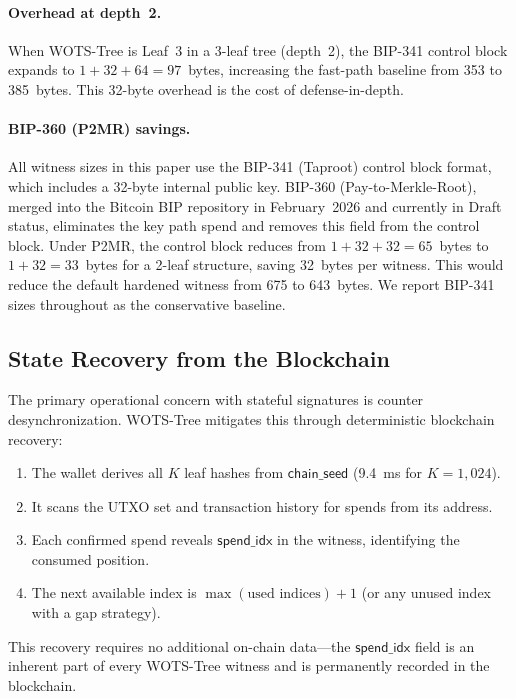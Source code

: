 \documentclass[11pt,a4paper]{article}
\theoremstyle{definition}
\begin{document}
\paragraph{Overhead at depth~2.} When WOTS-Tree is Leaf~3 in a 3-leaf tree (depth~2), the BIP-341 control block expands to $1 + 32 + 64 = 97$~bytes, increasing the fast-path baseline from 353 to 385~bytes. This 32-byte overhead is the cost of defense-in-depth.

\paragraph{BIP-360 (P2MR) savings.} All witness sizes in this paper use the BIP-341 (Taproot) control block format, which includes a 32-byte internal public key. BIP-360 (Pay-to-Merkle-Root), merged into the Bitcoin BIP repository in February~2026 and currently in Draft status, eliminates the key path spend and removes this field from the control block. Under P2MR, the control block reduces from $1 + 32 + 32 = 65$~bytes to $1 + 32 = 33$~bytes for a 2-leaf structure, saving 32~bytes per witness. This would reduce the default hardened witness from 675 to 643~bytes. We report BIP-341 sizes throughout as the conservative baseline.

\subsection{State Recovery from the Blockchain}
\label{sec:state-recovery}

The primary operational concern with stateful signatures is counter desynchronization. WOTS-Tree mitigates this through deterministic blockchain recovery:

\begin{enumerate}[nosep]
    \item The wallet derives all $K$ leaf hashes from $\mathsf{chain\_seed}$ (9.4~ms for $K = 1{,}024$).
    \item It scans the UTXO set and transaction history for spends from its address.
    \item Each confirmed spend reveals $\mathsf{spend\_idx}$ in the witness, identifying the consumed position.
    \item The next available index is $\max(\text{used indices}) + 1$ (or any unused index with a gap strategy).
\end{enumerate}

This recovery requires no additional on-chain data---the $\mathsf{spend\_idx}$ field is an inherent part of every WOTS-Tree witness and is permanently recorded in the blockchain.
\end{document}
